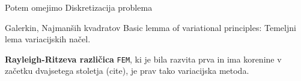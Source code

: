 Potem omejimo Diskretizacija problema 

Galerkin, Najmanših kvadratov \cite{JiangB-LSFEM}
Basic lemma of variational principles: Temeljni lema variacijskih načel.

\textbf{Rayleigh-Ritzeva različica} \texttt{FEM}, ki je bila razvita prva in ima korenine v začetku dvajsetega stoletja (cite), je prav tako variacijska metoda.